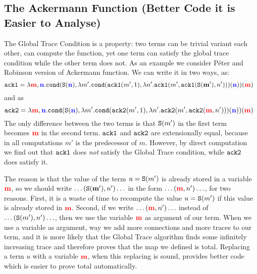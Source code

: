 \subsection{The Ackermann Function (Better Code it is Easier to Analyse)}
The Global Trace Condition is a  property: two
terms can be trivial variant each other, can compute the function, yet
one term can satisfy the global trace condition while the other term does not.
As an example we consider Péter and Robinson version of Ackermann function. We can write it in two ways, as:
  \[
  {\tt ack1} = \lambda {{\bf \color{red}{m}}}, {{\bf \color{blue}{n}}}.{\tt cond}({\tt S}({{\bf \color{blue}{n}}}),\lambda m'.{\tt cond}({\tt ack1}(m',1),\lambda n'.{\tt ack1}(m',{\tt ack1}(\mathbf{{\tt S}(m')},n')))({{\bf \color{blue}{n}}}))({{\bf \color{red}{m}}})
  \]
and as 
  \[
  {\tt ack2} = \lambda {{\bf \color{red}{m}}}, {{\bf \color{blue}{n}}}.
{\tt cond}({\tt S}({{\bf \color{blue}{n}}}),\lambda m'.{\tt cond}({\tt ack2}(m',1),\lambda n'.{\tt ack2}(m',{\tt ack2}({{\bf \color{red}{m}}},n')))({{\bf \color{blue}{n}}}))({{\bf \color{red}{m}}})
  \]
The only difference between the two terms is that ${\tt S}(m')$ in the first
term becomes ${{\bf \color{red}{m}}}$ in the second term. ${\tt ack1}$ and ${\tt ack2}$ are 
extensionally equal, because in all computations $m'$ is the predecessor of $m$. 
However, by direct computation we find out that 
${\tt ack1}$ does \emph{not} satisfy the Global Trace condition, while ${\tt ack2}$ does
satisfy it. 

The reason is that the value of the term $u= {\tt S}(m')$ is already stored in a 
variable ${{\bf \color{red}{m}}}$, so we should write $\ldots (\mathbf{{\tt S}(m')},n') \ldots$ in the 
form  $\ldots ({{\bf \color{red}{m}}},n') \ldots$, for two reasons.
First, it is a waste of time to recompute the value $u= {\tt S}(m')$ if this value is 
already stored in ${{\bf \color{red}{m}}}$. Second, if we write $\ldots ({{\bf \color{red}{m}}},n') \ldots$ instead of 
$\ldots ({\tt S}(m'),n') \ldots$, then we use the variable ${{\bf \color{red}{m}}}$ as argument of our
term. When we use a variable as argument, way we add more connections and 
more traces to our term, and it is more likely that the Global Trace algorithm finds 
some infinitely increasing trace and therefore proves that the map we defined is 
total. Replacing  a term $u$ with a variable ${{\bf \color{red}{m}}}$, when this replacing is sound, 
provides better code which is easier to prove total automatically.